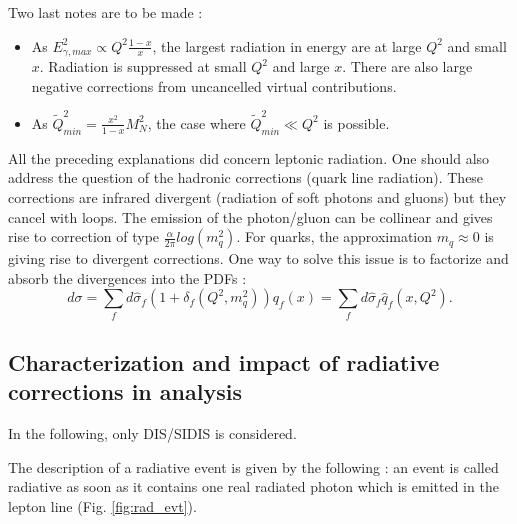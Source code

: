 Two last notes are to be made :
\begin{itemize}
\item As $E^{2}_{\gamma,max} \propto Q^{2}\frac{1-x}{x}$, the largest radiation in energy are at large $Q^{2}$ and small $x$. Radiation is suppressed at small $Q^{2}$ and large $x$. There are also large negative corrections from uncancelled virtual contributions.
\item As $\tilde{Q}^{2}_{min} = \frac{x^{2}}{1-x}M^{2}_{N}$, the case where $\tilde{Q}^{2}_{min} \ll Q^{2}$ is possible.
\end{itemize}

All the preceding explanations did concern leptonic radiation. One should also address the question of the hadronic corrections (quark line radiation). These corrections are infrared divergent (radiation of soft photons and gluons) but they cancel with loops. The emission of the photon/gluon can be collinear and gives rise to correction of type $\frac{\alpha}{2\pi}log(m_{q}^{2})$. For quarks, the approximation $m_{q} \approx 0$ is giving rise to divergent corrections. One way to solve this issue is to factorize and absorb the divergences into the PDFs :
%
\begin{equation}
  d\sigma = \sum_{f}d\hat{\sigma}_{f}(1+\delta_{f}(Q^{2},m^{2}_{q}))q_{f}(x) = \sum_{f}d\hat{\sigma}_{f}\hat{q}_{f}(x,Q^{2}).
\end{equation}

\subsection{Characterization and impact of radiative corrections in analysis}

In the following, only DIS/SIDIS is considered.

The description of a radiative event is given by the following : an event is called radiative as soon as it contains one real radiated photon which is emitted in the lepton line (Fig. \ref{fig:rad_evt}).

